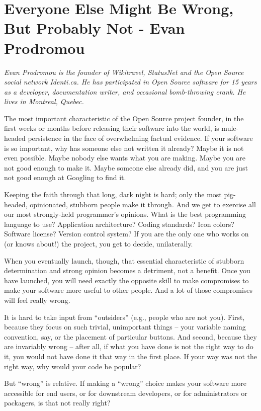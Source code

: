 \chapter{Everyone Else Might Be Wrong, But Probably Not - Evan Prodromou}

\textit{Evan Prodromou is the founder of Wikitravel, StatusNet and the Open Source social network Identi.ca. He has participated in Open Source software for 15 years as a
developer, documentation writer, and occasional bomb-throwing crank. He lives in
Montreal, Quebec.}

The most important characteristic of the Open Source project founder, in the
first weeks or months before releasing their software into the world, is
mule-headed persistence in the face of overwhelming factual evidence. If your
software is so important, why has someone else not written it already? Maybe it is not even possible. Maybe nobody else wants what you are making. Maybe you are not good enough to make it. Maybe someone else already did, and you are just not good enough at Googling to find it.

Keeping the faith through that long, dark night is hard; only the most
pig-headed, opinionated, stubborn people make it through. And we get to exercise
all our most strongly-held programmer's opinions. What is the best programming
language to use? Application architecture? Coding standards? Icon colors?
Software license? Version control system? If you are the only one who works on
(or knows about!) the project, you get to decide, unilaterally.

When you eventually launch, though, that essential characteristic of stubborn
determination and strong opinion becomes a detriment, not a benefit. Once you have launched, you will need exactly the opposite skill to make compromises to make your software more useful to other people. And a lot of those compromises will feel really wrong.

It is hard to take input from ``outsiders'' (e.g., people who are not you). First, because they focus on such trivial, unimportant things -- your variable naming convention, say, or the placement of particular buttons. And second, because they are invariably wrong -- after all, if what you have done is not the right way to do it, you would not have done it that way in the first place. If your way was not the right way, why would your code be popular?

But ``wrong'' is relative. If making a ``wrong'' choice makes your software more
accessible for end users, or for downstream developers, or for administrators or
packagers, is that not really right?

